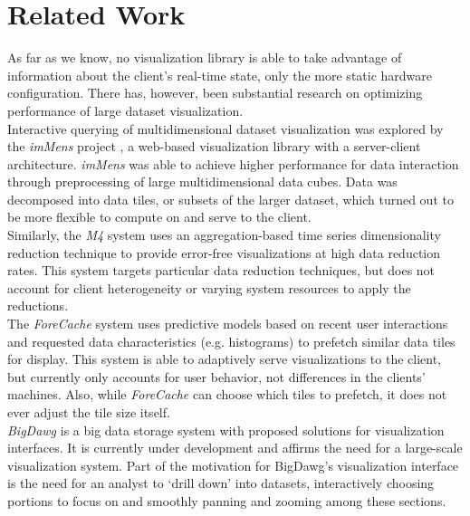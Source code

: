 \section{Related Work}\label{visgoth-ch:related-work}

As far as we know, no visualization library is able to take advantage of
information about the client's real-time state, only the more static hardware
configuration. There has, however, been substantial research on optimizing
performance of large dataset visualization. \\

Interactive querying of multidimensional dataset visualization was explored by
the \emph{imMens} project \cite{immens}, a web-based visualization library with
a server-client architecture. \emph{imMens} was able to achieve higher
performance for data interaction through preprocessing of large
multidimensional data cubes. Data was decomposed into data tiles, or subsets of
the larger dataset, which turned out to be more flexible to compute on and
serve to the client. \\

Similarly, the \emph{M4} system \cite{m4} uses an aggregation-based time series
dimensionality reduction technique to provide error-free visualizations at high
data reduction rates. This system targets particular data reduction techniques,
but does not account for client heterogeneity or varying system resources to
apply the reductions. \\

The \emph{ForeCache} system \cite{forecache} uses predictive models based on
recent user interactions and requested data characteristics (e.g. histograms)
to prefetch similar data tiles for display. This system is able to adaptively
serve visualizations to the client, but currently only accounts for user
behavior, not differences in the clients' machines. Also, while
\emph{ForeCache} can choose which tiles to prefetch, it does not ever adjust
the tile size itself.\\

\emph{BigDawg} \cite{bigdawg} is a big data storage system with proposed solutions
for visualization interfaces. It is currently under development and affirms the
need for a large-scale visualization system. Part of the motivation for
BigDawg's visualization interface is the need for an analyst to `drill down'
into datasets, interactively choosing portions to focus on and smoothly panning
and zooming among these sections. \\

